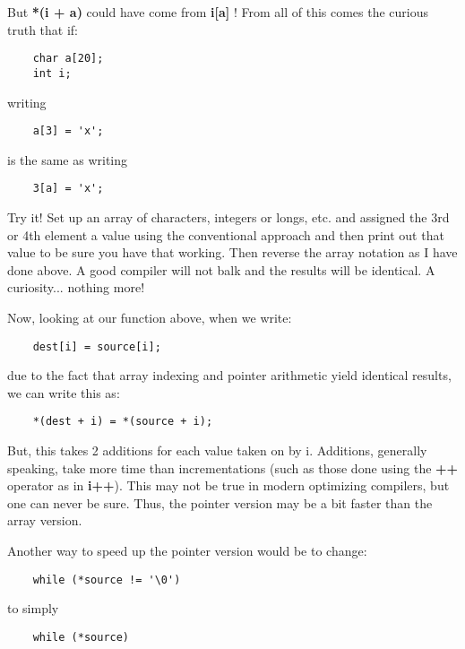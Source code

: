 But \textbf{*(i + a)} could have come from \textbf{i{[}a{]}} ! From all
of this comes the curious truth that if:

\begin{verbatim}
    char a[20];
    int i;
\end{verbatim}

writing

\begin{verbatim}
    a[3] = 'x';
\end{verbatim}

is the same as writing

\begin{verbatim}
    3[a] = 'x';
\end{verbatim}

Try it! Set up an array of characters, integers or longs, etc. and
assigned the 3rd or 4th element a value using the conventional approach
and then print out that value to be sure you have that working. Then
reverse the array notation as I have done above. A good compiler will
not balk and the results will be identical. A curiosity... nothing more!

Now, looking at our function above, when we write:

\begin{verbatim}
    dest[i] = source[i];
\end{verbatim}

due to the fact that array indexing and pointer arithmetic yield
identical results, we can write this as:

\begin{verbatim}
    *(dest + i) = *(source + i);
\end{verbatim}

But, this takes 2 additions for each value taken on by i. Additions,
generally speaking, take more time than incrementations (such as those
done using the \textbf{++} operator as in \textbf{i++}). This may not be
true in modern optimizing compilers, but one can never be sure. Thus,
the pointer version may be a bit faster than the array version.

Another way to speed up the pointer version would be to change:

\begin{verbatim}
    while (*source != '\0')
\end{verbatim}

to simply

\begin{verbatim}
    while (*source)
\end{verbatim}

